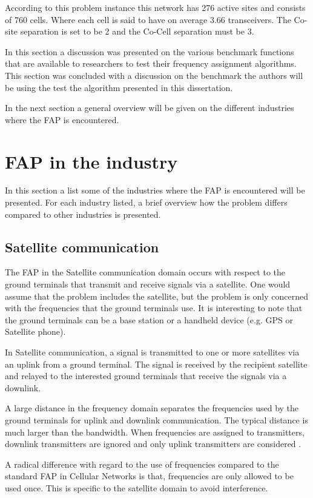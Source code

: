 According to this problem instance this network has 276 active sites and consists of 760 cells. Where each cell is said to have on average 3.66 transceivers. The Co-site separation is set to be 2 and the Co-Cell separation must be 3.

In this section a discussion was presented on the various benchmark functions that are available to researchers to test their frequency assignment algorithms. This section was concluded with a discussion on the benchmark the authors will be using the test the algorithm presented in this dissertation.

In the next section a general overview will be given on the different industries where the FAP is encountered.
\section{FAP in the industry}
\label{sec:FAPIndustry}
In this section a list some of the industries where the FAP is encountered will be presented. For each industry listed, a brief overview how the problem differs compared to other industries is presented. 

\subsection{Satellite communication}
The FAP in the Satellite communication domain occurs with respect to the ground terminals that transmit and receive signals via a satellite. One would assume that the problem includes the satellite, but the problem is only concerned with the frequencies that the ground terminals use. It is interesting to note that the ground terminals can be a base station or a handheld device (e.g. GPS or Satellite phone).

In Satellite communication, a signal is transmitted to one or more satellites via an uplink from a ground terminal. The signal is received by the recipient satellite and relayed to the interested ground terminals that receive the signals via a downlink.

 A large distance in the frequency domain separates the frequencies used by the ground terminals for uplink and downlink communication. The typical distance is much larger than the bandwidth. When frequencies are assigned to transmitters, downlink transmitters are ignored and only uplink transmitters are considered \cite{Karen2004}. 

A radical difference with regard to the use of frequencies compared to the standard FAP in Cellular Networks is that, frequencies are only allowed to be used once. This is specific to the satellite domain to avoid interference\cite{Karen2004}.

